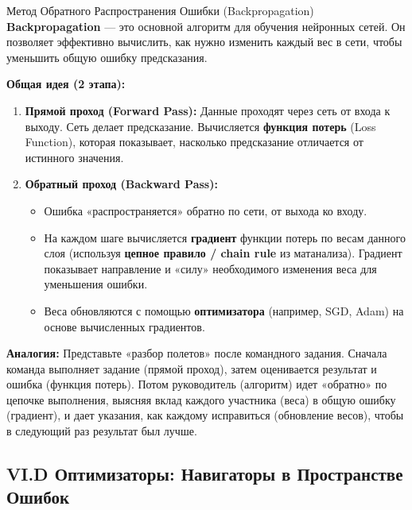 \begin{alerttextbox}{Метод Обратного Распространения Ошибки (Backpropagation)}
    \textbf{Backpropagation} — это основной алгоритм для обучения нейронных сетей. Он позволяет эффективно вычислить, как нужно изменить каждый вес в сети, чтобы уменьшить общую ошибку предсказания.

    \textbf{Общая идея (2 этапа):}
    \begin{enumerate}
        \item \textbf{Прямой проход (Forward Pass):} Данные проходят через сеть от входа к выходу. Сеть делает предсказание. Вычисляется \textbf{функция потерь} (Loss Function), которая показывает, насколько предсказание отличается от истинного значения.
        \item \textbf{Обратный проход (Backward Pass):}
            \begin{itemize}
                \item Ошибка «распространяется» обратно по сети, от выхода ко входу.
                \item На каждом шаге вычисляется \textbf{градиент} функции потерь по весам данного слоя (используя \textbf{цепное правило / chain rule} из матанализа). Градиент показывает направление и «силу» необходимого изменения веса для уменьшения ошибки.
                \item Веса обновляются с помощью \textbf{оптимизатора} (например, SGD, Adam) на основе вычисленных градиентов.
            \end{itemize}
    \end{enumerate}
    \textbf{Аналогия:} Представьте «разбор полетов» после командного задания. Сначала команда выполняет задание (прямой проход), затем оценивается результат и ошибка (функция потерь). Потом руководитель (алгоритм) идет «обратно» по цепочке выполнения, выясняя вклад каждого участника (веса) в общую ошибку (градиент), и дает указания, как каждому исправиться (обновление весов), чтобы в следующий раз результат был лучше.
\end{alerttextbox}

\subsection{VI.D Оптимизаторы: Навигаторы в Пространстве Ошибок}

